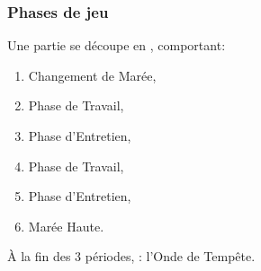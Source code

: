 \documentclass[11pt]{beamer}
\begin{document}
%
%		
%	
%	
%

	\begin{frame}
		\frametitle{Phases de jeu}
		
		Une partie se découpe en , comportant:
		\begin{enumerate}
			\item Changement de Marée,
			\item Phase de Travail,
			\item Phase d'Entretien,
			\item Phase de Travail,
			\item Phase d'Entretien,
			\item Marée Haute.
		\end{enumerate}
	
		À la fin des 3 périodes, : l'Onde de Tempête.
	\end{frame}
\end{document}
